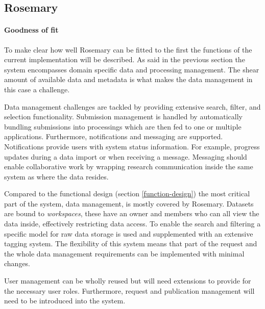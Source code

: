 \subsection{Rosemary}
\label{reuse-rosemary}

\paragraph{Goodness of fit}
To make clear how well Rosemary can be fitted to the \project{} first the functions of the current implementation will be described.
As said in the previous section the system encompasses domain specific data and processing management.
The shear amount of available data and metadata is what makes the data management in this case a challenge.

Data management challenges are tackled by providing extensive search, filter, and selection functionality.
Submission management is handled by automatically bundling submissions into processings which are then fed to one or multiple applications.
Furthermore, notifications and messaging are supported.
Notifications provide users with system status information. 
For example, progress updates during a data import or when receiving a message.
Messaging should enable collaborative work by wrapping research communication inside the same system as where the data resides.

Compared to the functional design (section \ref{function-design}) the most critical part of the system, data management, is mostly covered by Rosemary.
Datasets are bound to \emph{workspaces}, these have an owner and members who can all view the data inside, effectively restricting data access.
To enable the search and filtering a specific model for raw data storage is used and supplemented with an extensive tagging system.
The flexibility of this system means that part of the request and the whole data management requirements can be implemented with minimal changes.

User management can be wholly reused but will need extensions to provide for the necessary user roles.
Furthermore, request and publication management will need to be introduced into the system.

